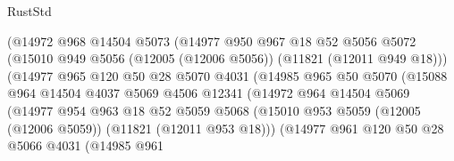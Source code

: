 \begin{lexlean}{RustStd}
\begin{coremodule}
                            (@14972
                              @968
                              @14504
                              @5073
                              (@14977
                                @950
                                @967
                                @18
                                @52
                                @5056
                                @5072
                                (@15010
                                  @949
                                  @5056
                                  (@12005 (@12006 @5056))
                                  (@11821 (@12011 @949 @18)))
                                (@14977
                                  @965
                                  @120
                                  @50
                                  @28
                                  @5070
                                  @4031
                                  (@14985
                                    @965
                                    @50
                                    @5070
                                    (@15088
                                      @964
                                      @14504
                                      @4037
                                      @5069
                                      @4506
                                      @12341
                                      (@14972
                                        @964
                                        @14504
                                        @5069
                                        (@14977
                                          @954
                                          @963
                                          @18
                                          @52
                                          @5059
                                          @5068
                                          (@15010
                                            @953
                                            @5059
                                            (@12005 (@12006 @5059))
                                            (@11821 (@12011 @953 @18)))
                                          (@14977
                                            @961
                                            @120
                                            @50
                                            @28
                                            @5066
                                            @4031
                                            (@14985
                                              @961

\end{coremodule}
\end{lexlean}
